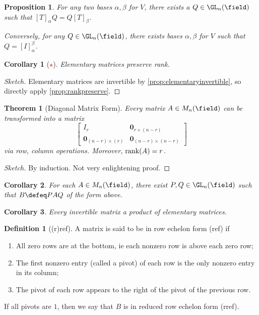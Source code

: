 \documentclass[12pt, oneside]{article}
\theoremstyle{definition}
\newtheorem{defn}{Definition}
\theoremstyle{plain}
\newtheorem{thm}{Theorem}
\newtheorem{cor}{Corollary}
\newtheorem{prop}{Proposition}
\theoremstyle{remark}
\begin{document}
\begin{prop}
For any two bases $\alpha, \beta$ for $V$, there exists a $Q \in \GL_n(\field)$ such that $[T]_\alpha Q = Q[T]_\beta$.

Conversely, for any $Q \in \GL_n(\field)$, there exists bases $\alpha, \beta$ for $V$ such that $Q = [I]_\alpha^\beta$.
\end{prop}

\begin{cor}[\textcolor{red}{$\star$}]
  Elementary matrices preserve rank.
\end{cor}

\begin{proof}[Sketch]
  Elementary matrices are invertible by \cref{prop:elementaryinvertible}, so directly apply \cref{prop:rankpreserve}.
\end{proof}

\begin{thm}[Diagonal Matrix Form]
  Every matrix $A \in M_{n}(\field)$ can be transformed into a matrix \[
    \begin{bmatrix}
      I_{r} & \mathbf{0}_{r \times (n-r)} \\
      \mathbf{0}_{(n-r) \times (r)} & \mathbf{0}_{(n-r) \times (n-r)}
  \end{bmatrix}  
  \]
  via row, column operations. Moreover, $\rank(A) = r$.
\end{thm}

\begin{proof}[Sketch]
  By induction. Not very enlightening proof.
\end{proof}

\begin{cor}
    For each $A \in M_{n}(\field)$, there exist $P, Q \in \GL_n(\field)$ such that $B \defeq P AQ$ of the form above.
\end{cor}

\begin{cor}
  Every invertible matrix a product of elementary matrices.
\end{cor}




\begin{defn}[(r)ref]
  A matrix is said to be in row echelon form (ref) if 
  \begin{enumerate}
    \item All zero rows are at the bottom, ie each nonzero row is above each zero row;
    \item The first nonzero entry (called a pivot) of each row is the only nonzero entry in its column;
    \item The pivot of each row appears to the right of the pivot of the previous row.
\end{enumerate}
If all pivots are $1$, then we say that $B$ is in reduced row echelon form (rref).
\end{defn}
\end{document}
